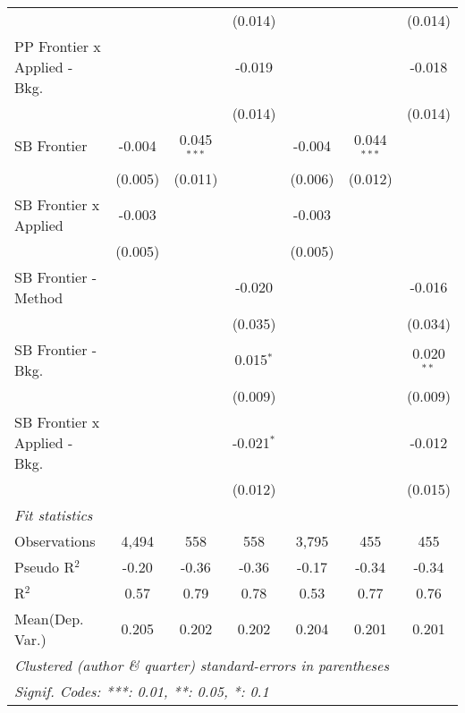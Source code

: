 \begin{tabular}{lcccccc}
                                  &               &               & (0.014)       &               &               & (0.014)\\   
   PP Frontier x Applied - Bkg.   &               &               & -0.019        &               &               & -0.018\\   
                                  &               &               & (0.014)       &               &               & (0.014)\\   
   SB Frontier                    & -0.004        & 0.045$^{***}$ &               & -0.004        & 0.044$^{***}$ &   \\   
                                  & (0.005)       & (0.011)       &               & (0.006)       & (0.012)       &   \\   
   SB Frontier x Applied          & -0.003        &               &               & -0.003        &               &   \\   
                                  & (0.005)       &               &               & (0.005)       &               &   \\   
   SB Frontier - Method           &               &               & -0.020        &               &               & -0.016\\   
                                  &               &               & (0.035)       &               &               & (0.034)\\   
   SB Frontier - Bkg.             &               &               & 0.015$^{*}$   &               &               & 0.020$^{**}$\\   
                                  &               &               & (0.009)       &               &               & (0.009)\\   
   SB Frontier x Applied - Bkg.   &               &               & -0.021$^{*}$  &               &               & -0.012\\   
                                  &               &               & (0.012)       &               &               & (0.015)\\   
   \midrule
   \emph{Fit statistics}\\
   Observations                   & 4,494         & 558           & 558           & 3,795         & 455           & 455\\  
   Pseudo R$^2$                   & -0.20         & -0.36         & -0.36         & -0.17         & -0.34         & -0.34\\  
   R$^2$                          & 0.57          & 0.79          & 0.78          & 0.53          & 0.77          & 0.76\\  
Mean(Dep. Var.) & 0.205 & 0.202 & 0.202 & 0.204 & 0.201 & 0.201 \\
   \midrule \midrule
   \multicolumn{7}{l}{\emph{Clustered (author \& quarter) standard-errors in parentheses}}\\
   \multicolumn{7}{l}{\emph{Signif. Codes: ***: 0.01, **: 0.05, *: 0.1}}\\
\end{tabular}
\par\endgroup
